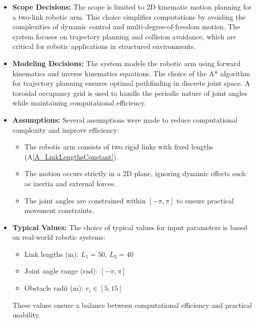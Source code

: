 \documentclass[12pt]{article}
\newcommand{\aref}[1]{A\ref{#1}}
\begin{document}
  \noindent \begin{itemize}
  
  \item \textbf{Scope Decisions:}  
  The scope is limited to 2D kinematic motion planning for a two-link robotic arm. This choice simplifies computations by avoiding the complexities of dynamic control and multi-degree-of-freedom motion. The system focuses on trajectory planning and collision avoidance, which are critical for robotic applications in structured environments.
  
  \item \textbf{Modeling Decisions:}  
  The system models the robotic arm using forward kinematics and inverse kinematics equations. The choice of the A* algorithm for trajectory planning ensures optimal pathfinding in discrete joint space. A toroidal occupancy grid is used to handle the periodic nature of joint angles while maintaining computational efficiency.
  
  \item \textbf{Assumptions:}  
  Several assumptions were made to reduce computational complexity and improve efficiency:
    \begin{itemize}
      \item The robotic arm consists of two rigid links with fixed lengths (\aref{A_LinkLengthsConstant}).
      \item The motion occurs strictly in a 2D plane, ignoring dynamic effects such as inertia and external forces.
      \item The joint angles are constrained within \([- \pi, \pi]\) to ensure practical movement constraints.
    \end{itemize}
  
  \item \textbf{Typical Values:}  
  The choice of typical values for input parameters is based on real-world robotic systems:
    \begin{itemize}
      \item Link lengths (\si{\metre}): $L_1 = 50$, $L_2 = 40$ 
      \item Joint angle range (\si{\radian}): $[-\pi, \pi]$
      \item Obstacle radii (\si{\metre}): $r_i \in [5, 15]$ 
    \end{itemize}
    These values ensure a balance between computational efficiency and practical usability.
  
  \end{itemize}
  
\end{document}
